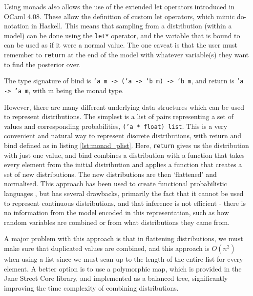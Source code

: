 Using monads also allows the use of the extended let operators introduced in OCaml 4.08. These allow the definition of custom let operators, which mimic do-notation in Haskell. This means that sampling from a distribution (within a model) can be done using the \texttt{let*} operator, and the variable that is bound to can be used as if it were a normal value. The one caveat is that the user must remember to \texttt{return} at the end of the model with whatever variable(s) they want to find the posterior over.

The type signature of bind is \texttt{'a m -> ('a -> 'b m) -> 'b m}, and return is \texttt{'a -> 'a m}, with m being the monad type.


However, there are many different underlying data structures which can be used to represent distributions. The simplest is a list of pairs representing a set of values and corresponding probabilities, \texttt{('a * float) list}. This is a very convenient and natural way to represent discrete distributions, with return and bind defined as in listing \ref{lst:monad_plist}. Here, \texttt{return} gives us the distribution with just one value, and bind combines a distribution with a function that takes every element from the initial distribution and applies a function that creates a set of new distributions. The new distributions are then `flattened' and normalised. This approach has been used to create functional probabilistic languages \cite{erwig}, but has several drawbacks, primarily the fact that it cannot be used to represent continuous distributions, and that inference is not efficient - there is no information from the model encoded in this representation, such as how random variables are combined or from what distributions they came from.



A major problem with this approach is that in flattening distributions, we must make sure that duplicated values are combined, and this approach is $O(n^2)$ when using a list since we must scan up to the length of the entire list for every element. A better option is to use a polymorphic map, which is provided in the Jane Street Core library, and implemented as a balanced tree, significantly improving the time complexity of combining distributions.

